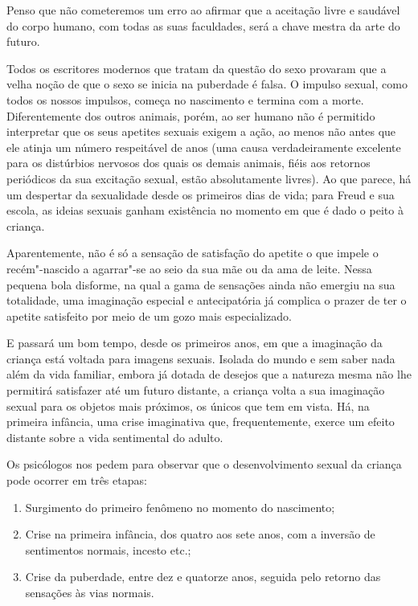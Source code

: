 Penso que não cometeremos um erro ao afirmar que a aceitação livre e
saudável do corpo humano, com todas as suas faculdades, será a chave
mestra da arte do futuro.

\asterisc

Todos os escritores modernos que tratam da questão do sexo provaram que
a velha noção de que o sexo se inicia na puberdade é falsa. O impulso
sexual, como todos os nossos impulsos, começa no nascimento e termina
com a morte. Diferentemente dos outros animais, porém, ao ser humano não é
permitido interpretar que os seus apetites sexuais exigem a ação, ao
menos não antes que ele atinja um número respeitável de anos (uma causa
verdadeiramente excelente para os distúrbios nervosos dos quais os
demais animais, fiéis aos retornos periódicos da sua excitação sexual,
estão absolutamente livres). Ao que parece, há um despertar da
sexualidade desde os primeiros dias de vida; para Freud e sua escola, as
ideias sexuais ganham existência no momento em que é dado o peito à criança.

Aparentemente, não é só a sensação de satisfação do apetite o que
impele o recém"-nascido a agarrar"-se ao seio da sua mãe ou da ama de
leite. Nessa pequena bola disforme, na qual a gama de sensações ainda
não emergiu na sua totalidade, uma imaginação especial e antecipatória
já complica o prazer de ter o apetite satisfeito por meio de um gozo
mais especializado.

E passará um bom tempo, desde os primeiros anos, em que a imaginação da
criança está voltada para imagens sexuais. Isolada do mundo e sem saber
nada além da vida familiar, embora já dotada de desejos que a
natureza mesma não lhe permitirá satisfazer até um futuro distante, a
criança volta a sua imaginação sexual para os objetos mais próximos, os
únicos que tem em vista. Há, na primeira infância, uma crise
imaginativa que, frequentemente, exerce um efeito distante sobre a vida
sentimental do adulto.

Os psicólogos nos pedem para observar que o desenvolvimento sexual da
criança pode ocorrer em três etapas:

\begin{enumerate}
\item Surgimento do primeiro fenômeno no momento do nascimento;

\item Crise na primeira infância, dos quatro aos sete anos, com a inversão de
sentimentos normais, incesto etc.;

\item Crise da puberdade, entre dez e quatorze anos, seguida pelo retorno
das sensações às vias normais.
\end{enumerate}

